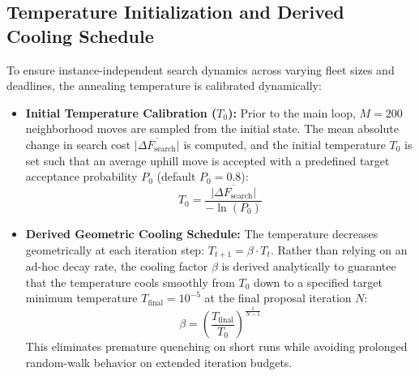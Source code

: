 \subsection{Temperature Initialization and Derived Cooling Schedule}
To ensure instance-independent search dynamics across varying fleet sizes and deadlines, the annealing temperature is calibrated dynamically:
\begin{itemize}
    \item \textbf{Initial Temperature Calibration ($T_0$):} Prior to the main loop, $M = 200$ neighborhood moves are sampled from the initial state. The mean absolute change in search cost $\overline{|\Delta F_{\text{search}}|}$ is computed, and the initial temperature $T_0$ is set such that an average uphill move is accepted with a predefined target acceptance probability $P_0$ (default $P_0 = 0.8$):
    \begin{equation}
        T_0 = \frac{\overline{|\Delta F_{\text{search}}|}}{-\ln(P_0)}
    \end{equation}
    \item \textbf{Derived Geometric Cooling Schedule:} The temperature decreases geometrically at each iteration step: $T_{t+1} = \beta \cdot T_t$. Rather than relying on an ad-hoc decay rate, the cooling factor $\beta$ is derived analytically to guarantee that the temperature cools smoothly from $T_0$ down to a specified target minimum temperature $T_{\text{final}} = 10^{-5}$ at the final proposal iteration $N$:
    \begin{equation}
        \beta = \left(\frac{T_{\text{final}}}{T_0}\right)^{\frac{1}{N-1}}
    \end{equation}
    This eliminates premature quenching on short runs while avoiding prolonged random-walk behavior on extended iteration budgets.
\end{itemize}

